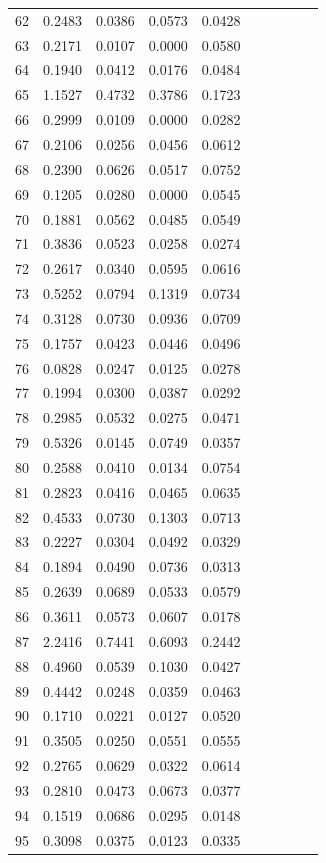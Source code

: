 \begin{table}
\begin{tabular}{cccccccccc}
62& 0.2483& 0.0386& 0.0573& 0.0428\\ 
63& 0.2171& 0.0107& 0.0000& 0.0580\\ 
64& 0.1940& 0.0412& 0.0176& 0.0484\\ 
65& 1.1527& 0.4732& 0.3786& 0.1723\\ 
66& 0.2999& 0.0109& 0.0000& 0.0282\\ 
67& 0.2106& 0.0256& 0.0456& 0.0612\\ 
68& 0.2390& 0.0626& 0.0517& 0.0752\\ 
69& 0.1205& 0.0280& 0.0000& 0.0545\\ 
70& 0.1881& 0.0562& 0.0485& 0.0549\\ 
71& 0.3836& 0.0523& 0.0258& 0.0274\\ 
72& 0.2617& 0.0340& 0.0595& 0.0616\\ 
73& 0.5252& 0.0794& 0.1319& 0.0734\\ 
74& 0.3128& 0.0730& 0.0936& 0.0709\\ 
75& 0.1757& 0.0423& 0.0446& 0.0496\\ 
76& 0.0828& 0.0247& 0.0125& 0.0278\\ 
77& 0.1994& 0.0300& 0.0387& 0.0292\\ 
78& 0.2985& 0.0532& 0.0275& 0.0471\\ 
79& 0.5326& 0.0145& 0.0749& 0.0357\\ 
80& 0.2588& 0.0410& 0.0134& 0.0754\\ 
81& 0.2823& 0.0416& 0.0465& 0.0635\\ 
82& 0.4533& 0.0730& 0.1303& 0.0713\\ 
83& 0.2227& 0.0304& 0.0492& 0.0329\\ 
84& 0.1894& 0.0490& 0.0736& 0.0313\\ 
85& 0.2639& 0.0689& 0.0533& 0.0579\\ 
86& 0.3611& 0.0573& 0.0607& 0.0178\\ 
87& 2.2416& 0.7441& 0.6093& 0.2442\\ 
88& 0.4960& 0.0539& 0.1030& 0.0427\\ 
89& 0.4442& 0.0248& 0.0359& 0.0463\\ 
90& 0.1710& 0.0221& 0.0127& 0.0520\\ 
91& 0.3505& 0.0250& 0.0551& 0.0555\\ 
92& 0.2765& 0.0629& 0.0322& 0.0614\\ 
93& 0.2810& 0.0473& 0.0673& 0.0377\\ 
94& 0.1519& 0.0686& 0.0295& 0.0148\\ 
95& 0.3098& 0.0375& 0.0123& 0.0335\\ 

\end{tabular}
\end{table}
